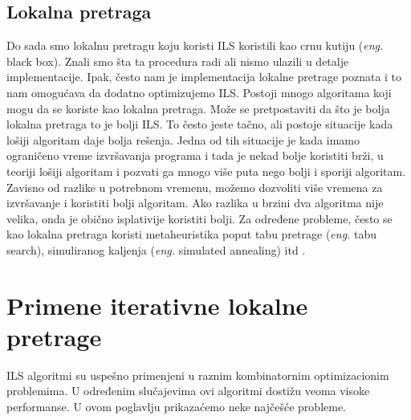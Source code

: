 \documentclass[a4paper]{article}
\newcommand{\eng}[1]{(\textit{eng.} #1)}
\begin{document}
\subsection{Lokalna pretraga}

Do sada smo lokalnu pretragu koju koristi ILS koristili kao crnu kutiju \eng{black box}. Znali smo šta ta procedura radi ali nismo ulazili u detalje implementacije. Ipak, često nam je implementacija lokalne pretrage poznata 
i to nam omogućava da dodatno optimizujemo ILS. Postoji mnogo algoritama koji mogu da se koriste kao lokalna pretraga. Može se pretpostaviti da što je bolja lokalna pretraga to je bolji ILS. To često jeste tačno, ali postoje 
situacije kada lošiji algoritam daje bolja rešenja. Jedna od tih situacije je kada imamo ograničeno vreme izvršavanja programa i tada je nekad bolje koristiti brži, u teoriji lošiji algoritam i pozvati ga mnogo više puta nego 
bolji i sporiji algoritam. Zavisno od razlike u potrebnom vremenu, možemo dozvoliti više vremena za izvršavanje i koristiti bolji algoritam. Ako razlika u brzini dva algoritma nije velika, onda je obično isplativije koristiti bolji. 
Za određene probleme, često se kao lokalna pretraga koristi metaheuristika poput tabu pretrage \eng{tabu search}, simuliranog kaljenja \eng{simulated annealing} itd \cite{handbookOfMetaheuristics}.



\section{Primene iterativne lokalne pretrage}
ILS algoritmi su uspešno primenjeni u raznim kombinatornim optimizacionim problemima. U određenim slučajevima ovi algoritmi dostižu veoma visoke performanse. U ovom poglavlju prikazaćemo neke najčešće probleme.
\end{document}
